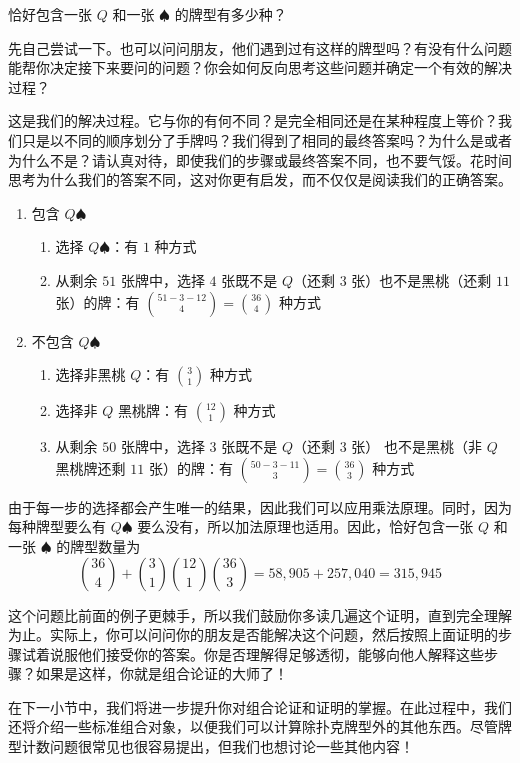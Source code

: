 \begin{example}

    恰好包含一张 $Q$ 和一张 $\spadesuit$ 的牌型有多少种？

    先自己尝试一下。也可以问问朋友，他们遇到过有这样的牌型吗？有没有什么问题能帮你决定接下来要问的问题？你会如何反向思考这些问题并确定一个有效的解决过程？

    这是我们的解决过程。它与你的有何不同？是完全相同还是在某种程度上等价？我们只是以不同的顺序划分了手牌吗？我们得到了相同的最终答案吗？为什么是或者为什么不是？请认真对待，即使我们的步骤或最终答案不同，也不要气馁。花时间思考为什么我们的答案不同，这对你更有启发，而不仅仅是阅读我们的正确答案。
    \begin{enumerate}
        \item 包含 $Q\spadesuit$
              \begin{enumerate}[label=(\alph*)]
                  \item 选择 $Q\spadesuit$：有 $1$ 种方式
                  \item 从剩余 $51$ 张牌中，选择 $4$ 张既不是 $Q$（还剩 $3$ 张）也不是黑桃（还剩 $11$ 张）的牌：有 ${51-3-12 \choose 4}={36 \choose 4}$ 种方式
              \end{enumerate}
        \item 不包含 $Q\spadesuit$
              \begin{enumerate}[label=(\alph*)]
                  \item 选择非黑桃 $Q$：有 ${3 \choose 1}$ 种方式
                  \item 选择非 $Q$ 黑桃牌：有 ${12 \choose 1}$ 种方式
                  \item 从剩余 $50$ 张牌中，选择 $3$ 张既不是 $Q$（还剩 $3$ 张） 也不是黑桃（非 $Q$ 黑桃牌还剩 $11$ 张）的牌：有 ${50-3-11 \choose 3}={36 \choose 3}$ 种方式
              \end{enumerate}
    \end{enumerate}
    由于每一步的选择都会产生唯一的结果，因此我们可以应用乘法原理。同时，因为每种牌型要么有 $Q\spadesuit$ 要么没有，所以加法原理也适用。因此，恰好包含一张 $Q$ 和一张 $\spadesuit$ 的牌型数量为
    \[{36 \choose 4}+{3 \choose 1}{12 \choose 1}{36 \choose 3} = 58,905 + 257,040 = 315,945\]

    这个问题比前面的例子更棘手，所以我们鼓励你多读几遍这个证明，直到完全理解为止。实际上，你可以问问你的朋友是否能解决这个问题，然后按照上面证明的步骤试着说服他们接受你的答案。你是否理解得足够透彻，能够向他人解释这些步骤？如果是这样，你就是组合论证的大师了！

    在下一小节中，我们将进一步提升你对组合论证和证明的掌握。在此过程中，我们还将介绍一些标准组合对象，以便我们可以计算除扑克牌型外的其他东西。尽管牌型计数问题很常见也很容易提出，但我们也想讨论一些其他内容！
\end{example}
